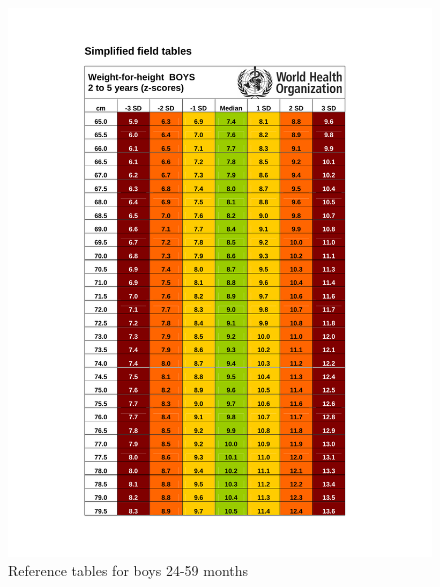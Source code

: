 \documentclass[
  12pt,
]{book}
\begin{document}
\begin{figure}[H]

{\centering \includegraphics[width=1\linewidth]{pdf/boys_24_60} 

}

\caption{Reference tables for boys 24-59 months}\label{fig:anthro1-2}
\end{figure}
\end{document}
